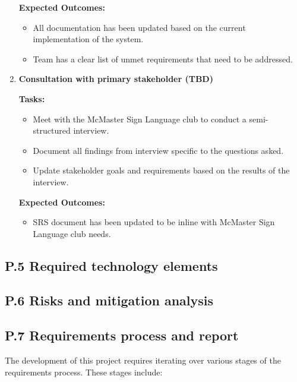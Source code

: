 \documentclass[12pt]{article}
\theoremstyle{definition}
\begin{document}
\begin{enumerate}
  \textbf{Expected Outcomes:}
  \begin{itemize}
      \item All documentation has been updated based on the current 
      implementation of the system. 
      \item Team has a clear list of unmet requirements that need to be 
      addressed. 
  \end{itemize}

  \vspace{0.8em}
  
  \item \textbf{Consultation with primary stakeholder (TBD)}    

  \textbf{Tasks:}
  \begin{itemize}
      \item Meet with the McMaster Sign Language club to conduct a
      semi-structured interview.
      \item Document all findings from interview specific to the questions
      asked. 
      \item Update stakeholder goals and requirements based on the results of 
      the interview. 
  \end{itemize}

  \textbf{Expected Outcomes:}
  \begin{itemize}
      \item SRS document has been updated to be inline with McMaster Sign 
      Language club needs. 
  \end{itemize}

  \vspace{0.8em}

\end{enumerate}


\subsection{P.5 Required technology elements}

\subsection{P.6 Risks and mitigation analysis}

\subsection{P.7 Requirements process and report}
The development of this project requires iterating over various stages of the
requirements process. These stages include:
\end{document}
